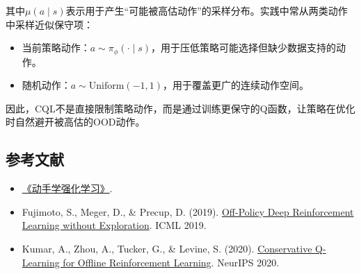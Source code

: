 其中\(\mu(a\mid s)\)表示用于产生``可能被高估动作''的采样分布。实践中常从两类动作中采样近似保守项：

\begin{itemize}
\tightlist
\item
  当前策略动作：\(a\sim\pi_\phi(\cdot\mid s)\)，用于压低策略可能选择但缺少数据支持的动作。
\item
  随机动作：\(a\sim\mathrm{Uniform}(-1,1)\)，用于覆盖更广的连续动作空间。
\end{itemize}

因此，CQL不是直接限制策略动作，而是通过训练更保守的Q函数，让策略在优化时自然避开被高估的OOD动作。

\FloatBarrier
{}
\hypertarget{ux53c2ux8003ux6587ux732e-64}{%
\subsection{参考文献}\label{ux53c2ux8003ux6587ux732e-64}}

\vspace{0.25em}
\begin{itemize}
\tightlist
\item
  \href{https://hrl.boyuai.com/}{《动手学强化学习》}.
\item
  Fujimoto, S., Meger, D., \& Precup, D. (2019). \href{https://arxiv.org/abs/1812.02900}{Off-Policy Deep Reinforcement Learning without Exploration}. ICML 2019.
\item
  Kumar, A., Zhou, A., Tucker, G., \& Levine, S. (2020). \href{https://arxiv.org/abs/2006.04779}{Conservative Q-Learning for Offline Reinforcement Learning}. NeurIPS 2020.
\end{itemize}

\clearpage
